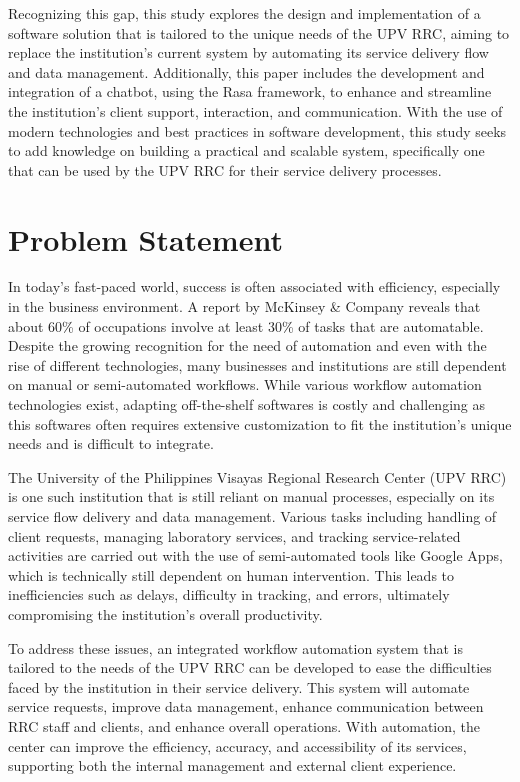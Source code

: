 Recognizing this gap, this study explores the design and implementation of a software solution that is tailored to the unique needs of the UPV RRC, aiming to replace the institution’s current system by automating its service delivery flow and data management. Additionally, this paper includes the development and integration of a chatbot, using the Rasa framework, to enhance and streamline the institution’s client support, interaction, and communication. With the use of modern technologies and best practices in software development, this study seeks to add knowledge on building a practical and scalable system, specifically one that can be used by the UPV RRC for their service delivery processes.

\section{Problem Statement}

In today’s fast-paced world, success is often associated with efficiency, especially in the business environment. A report by McKinsey \& Company \cite{manyika2017} reveals that about 60\% of occupations involve at least 30\% of tasks that are automatable. Despite the growing recognition for the need of automation and even with the rise of different technologies, many businesses and institutions are still dependent on manual or semi-automated workflows. While various workflow automation technologies exist, adapting off-the-shelf softwares is costly and challenging as this softwares often requires extensive customization to fit the institution’s unique needs and is difficult to integrate. 

The University of the Philippines Visayas Regional Research Center (UPV RRC) is one such institution that is still reliant on manual processes, especially on its service flow delivery and data management. Various tasks including handling of client requests, managing laboratory services, and tracking service-related activities are carried out with the use of semi-automated tools like Google Apps, which is technically still dependent on human intervention. This leads to inefficiencies such as delays, difficulty in tracking, and errors, ultimately compromising the institution’s overall productivity.

To address these issues, an integrated workflow automation system that is tailored to the needs of the UPV RRC can be developed to ease the difficulties faced by the institution in their service delivery. This system will  automate service requests, improve data management, enhance communication between RRC staff and clients, and enhance overall operations. With automation, the center can improve the efficiency, accuracy, and accessibility of its services, supporting both the internal management and external client experience.

